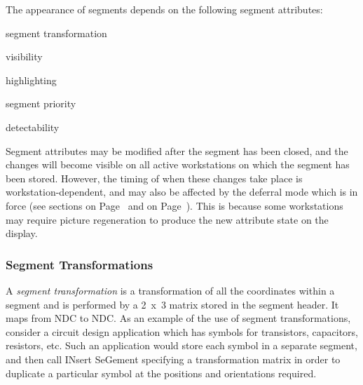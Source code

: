 The appearance of segments depends on the following segment attributes:
\begin{UL}
\item segment transformation
\item visibility
\item highlighting
\item segment priority
\item detectability
\end{UL}
Segment attributes may be modified after the segment has been closed,
and the changes will become visible on all active workstations
on which the segment has been stored. However, the timing of when these
changes take place is workstation-dependent, and may also be
affected by the deferral mode which is in force
(see sections on Page~\pageref{sec:defsta} and on Page~\pageref{grsgwk}).
This is because some workstations may require picture regeneration
to produce the new attribute state on the display.
\subsubsection{\protect\label{sec:segtfm}Segment Transformations}
 
A {\it segment transformation} is a transformation of all the
coordinates within a segment and is performed by a 2~x~3
matrix stored in the segment header. It maps from NDC to NDC. As an
example of the use of segment transformations, consider a circuit
design application which has symbols for transistors, capacitors,
resistors, etc. Such an application would store each symbol in a
separate segment, and then call INsert SeGement specifying a
transformation matrix in order to duplicate a particular symbol at the
positions and orientations required.
 
